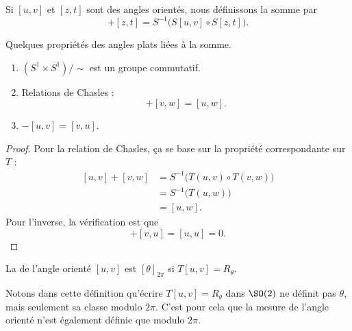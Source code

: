 \begin{definition}
    Si \( [u,v]\) et \( [z,t]\) sont des angles orientés, nous définissons la somme par
    \begin{equation}
        [u,v]+[z,t]=S^{-1}\Big( S[u,v]\circ S[z,t] \Big).
    \end{equation}
\end{definition}

\begin{lemma}       \label{LEMooWISVooYsStJp}
    Quelques propriétés des angles plats liées à la somme.
    \begin{enumerate}
        \item
            \( (S^1\times S^1)/\sim\) est un groupe commutatif.
        \item       \label{ITEMooBKTFooWbEvIU}
            Relations de Chasles :
            \begin{equation}
                [u,v]+[v,w]=[u,w].
            \end{equation}
        \item
            \( -[u,v]=[v,u]\).
    \end{enumerate}
\end{lemma}

\begin{proof}
    Pour la relation de Chasles, ça se base sur la propriété correspondante sur \( T\) :
    \begin{subequations}
        \begin{align}
            [u,v]+[v,w]&=S^{-1}\Big( T(u,v)\circ T(v,w) \Big)\\
            &=S^{-1}\big( T(u,w) \big)\\
            &=[u,w].
        \end{align}
    \end{subequations}
    Pour l'inverse, la vérification est que
    \begin{equation}
        [u,v]+[v,u]=[u,u]=0.
    \end{equation}
\end{proof}

\begin{definition}      \label{DEFooFLGNooCZUkHY}
    La  de l'angle orienté \( [u,v]\) est \( [\theta]_{2\pi}\) si \( T[u,v]=R_{\theta}\).
\end{definition}
Notons dans cette définition qu'écrire \( T[u,v]=R_{\theta}\) dans \( \SO(2)\) ne définit pas \( \theta\), mais seulement sa classe modulo \( 2\pi\). C'est pour cela que la mesure de l'angle orienté n'est également définie que modulo \( 2\pi\).

